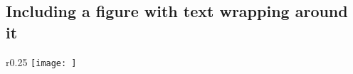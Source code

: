 \subsection{Including a figure with text wrapping around it} %
\lipsum[1-2]\par
\begin{wrapfigure}{r}{0.25\textwidth} %
    \centering
    \texttt{[image: ]} %
    \caption{}
    \label{fig:} %
\end{wrapfigure}

%


